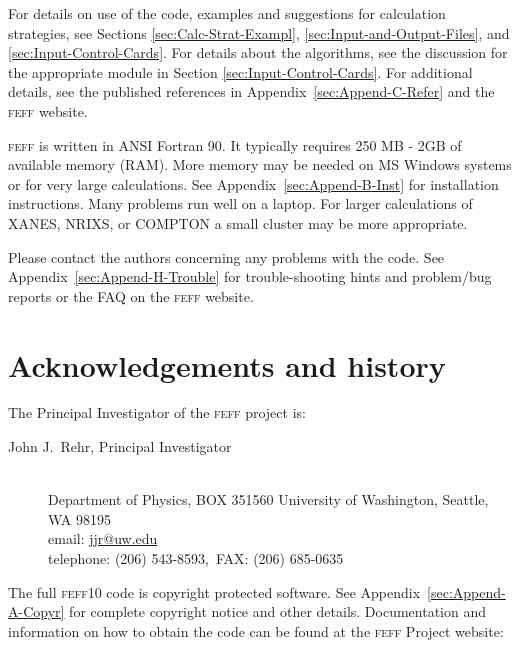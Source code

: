 \documentclass[11pt,oneside]{report} %
\newcommand{\feffcurrent}{\textsc{feff10}}
\renewcommand{\htmladdnormallink}[2]{\href{#2}{#1}}
\renewcommand{\htmlref}[2]{\hyperlink{#2}{#1}}
\newcommand{\program}[1]{\textsc{#1}}
\newcommand{\feff}{\program{feff}}
\renewcommand{\htmlref}[2]{{#1}} %
\begin{document}
\begin{latexonly}
For details on use of the code, examples
and suggestions for calculation strategies, see Sections
\ref{sec:Calc-Strat-Exampl}, \ref{sec:Input-and-Output-Files}, and \ref{sec:Input-Control-Cards}. For details about the algorithms,
see the discussion for the appropriate module in Section
\ref{sec:Input-Control-Cards}.  For additional details, see the published
references in Appendix~\ref{sec:Append-C-Refer} and the {\feff} website.

{\feff} is written in ANSI Fortran 90. It typically requires 250 MB - 2GB of available memory (RAM). More memory may be needed on MS Windows systems or for very large calculations.  See Appendix~\ref{sec:Append-B-Inst} for installation instructions.  Many problems run well on a laptop.  For larger calculations of XANES, NRIXS, or COMPTON a small cluster may be more appropriate.  

Please contact the authors concerning any problems with the code. See
Appendix~\ref{sec:Append-H-Trouble} for trouble-shooting hints and
problem/bug reports or the FAQ on the \htmlref{{\feff} website}
  {http://www.feffproject.org}.




\section{Acknowledgements and history}
\label{Acknowledgements}

The Principal Investigator of the {\feff} project is:
\begin{description}
\item[John J.~Rehr, Principal Investigator]\hfill\\
Department of Physics, BOX 351560 University of Washington, Seattle, WA 98195\\
email: \htmladdnormallink{jjr@uw.edu}
{mailto:jjr@phys.washington.edu}\\
telephone: (206) 543-8593,\  FAX: (206) 685-0635
\end{description}


The full {\feffcurrent} code is copyright protected software.
See Appendix~\ref{sec:Append-A-Copyr} for
complete copyright notice and other details. Documentation and
information on how to obtain the code can be found at the {\feff}
Project website:


\end{latexonly}
\end{document}
